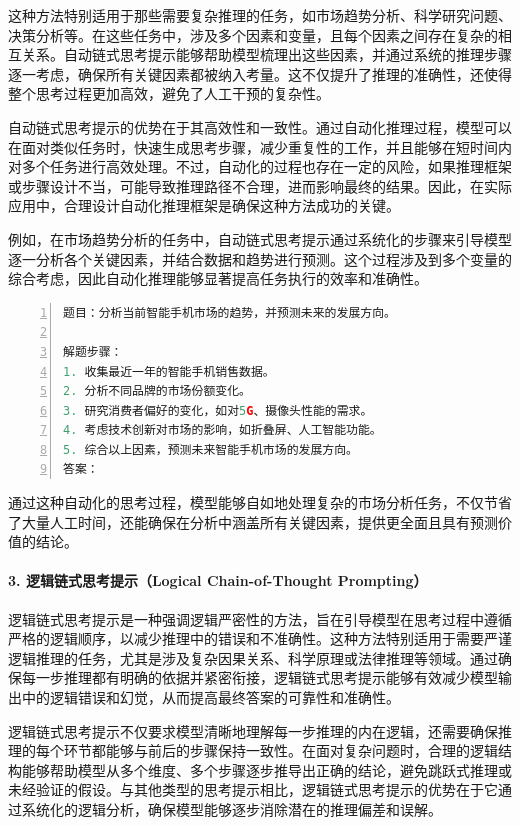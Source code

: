 这种方法特别适用于那些需要复杂推理的任务，如市场趋势分析、科学研究问题、决策分析等。在这些任务中，涉及多个因素和变量，且每个因素之间存在复杂的相互关系。自动链式思考提示能够帮助模型梳理出这些因素，并通过系统的推理步骤逐一考虑，确保所有关键因素都被纳入考量。这不仅提升了推理的准确性，还使得整个思考过程更加高效，避免了人工干预的复杂性。

自动链式思考提示的优势在于其高效性和一致性。通过自动化推理过程，模型可以在面对类似任务时，快速生成思考步骤，减少重复性的工作，并且能够在短时间内对多个任务进行高效处理。不过，自动化的过程也存在一定的风险，如果推理框架或步骤设计不当，可能导致推理路径不合理，进而影响最终的结果。因此，在实际应用中，合理设计自动化推理框架是确保这种方法成功的关键。

例如，在市场趋势分析的任务中，自动链式思考提示通过系统化的步骤来引导模型逐一分析各个关键因素，并结合数据和趋势进行预测。这个过程涉及到多个变量的综合考虑，因此自动化推理能够显著提高任务执行的效率和准确性。

\begin{lstlisting}[language={python},label={},caption={}, basicstyle=\footnotesize\ttfamily, breaklines=true, numbers=left, frame=single]
题目：分析当前智能手机市场的趋势，并预测未来的发展方向。

解题步骤：
1. 收集最近一年的智能手机销售数据。
2. 分析不同品牌的市场份额变化。
3. 研究消费者偏好的变化，如对5G、摄像头性能的需求。
4. 考虑技术创新对市场的影响，如折叠屏、人工智能功能。
5. 综合以上因素，预测未来智能手机市场的发展方向。
答案：
\end{lstlisting}

通过这种自动化的思考过程，模型能够自如地处理复杂的市场分析任务，不仅节省了大量人工时间，还能确保在分析中涵盖所有关键因素，提供更全面且具有预测价值的结论。

\paragraph{3. 逻辑链式思考提示（Logical Chain-of-Thought Prompting）} 

逻辑链式思考提示是一种强调逻辑严密性的方法，旨在引导模型在思考过程中遵循严格的逻辑顺序，以减少推理中的错误和不准确性。这种方法特别适用于需要严谨逻辑推理的任务，尤其是涉及复杂因果关系、科学原理或法律推理等领域。通过确保每一步推理都有明确的依据并紧密衔接，逻辑链式思考提示能够有效减少模型输出中的逻辑错误和幻觉，从而提高最终答案的可靠性和准确性。

逻辑链式思考提示不仅要求模型清晰地理解每一步推理的内在逻辑，还需要确保推理的每个环节都能够与前后的步骤保持一致性。在面对复杂问题时，合理的逻辑结构能够帮助模型从多个维度、多个步骤逐步推导出正确的结论，避免跳跃式推理或未经验证的假设。与其他类型的思考提示相比，逻辑链式思考提示的优势在于它通过系统化的逻辑分析，确保模型能够逐步消除潜在的推理偏差和误解。

